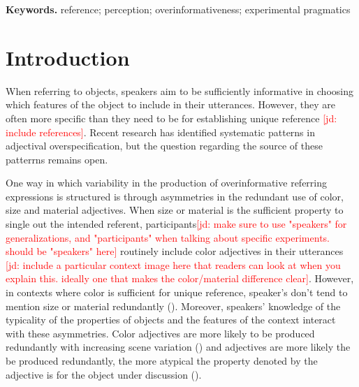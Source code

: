 \documentclass[12pt,letterpaper]{article}
\newcommand{\jd}[1]{\textcolor{Red}{[jd: #1]}}
\newenvironment{keywords}{%
\vspace{.5em}
\noindent\begin{minipage}{1\textwidth}
\setlength{\leftskip}{0.4in}
\setlength{\rightskip}{0.4in}
\textbf{Keywords.}}
{\end{minipage}}
\begin{document}
\begin{keywords} %
reference; perception; overinformativeness; experimental pragmatics
\end{keywords}

\section{Introduction} 

When referring to objects, speakers aim to be sufficiently informative in choosing which features of the object to include in their utterances. However, they are often more specific than they need to be for establishing unique reference \jd{include references}. Recent research has identified systematic patterns in adjectival overspecification, but the question regarding the source of these patterrns remains open.

One way in which variability in the production of overinformative referring expressions is structured is through asymmetries in the redundant use of color, size and material adjectives. When size or material is the sufficient property to single out the intended referent, participants\jd{make sure to use "speakers" for generalizations, and "participants" when talking about specific experiments. should be "speakers" here} routinely include color adjectives in their utterances \jd{include a particular context image here that readers can look at when you explain this. ideally one that makes the color/material difference clear}. However, in contexts where color is sufficient for unique reference, speaker's don't tend to mention size or material redundantly (\citealt{Pechmann1989, Sedivy2003, GattEtAl2011, RubioFernandez2016, DegenEtAl2020}). Moreover, speakers' knowledge of the typicality of the properties of objects and the features of the context interact with these asymmetries. Color adjectives are more likely to be produced redundantly with increasing scene variation (\citealt{DegenEtAl2020, DaviesKatsos2013, KoolenEtAl2013}) and adjectives are more likely the be produced redundantly, the more atypical the property denoted by the adjective is for the object under discussion (\citealt{DegenEtAl2020, WesterbeekEtAl2015, Mitchell2013}).
\end{document}
